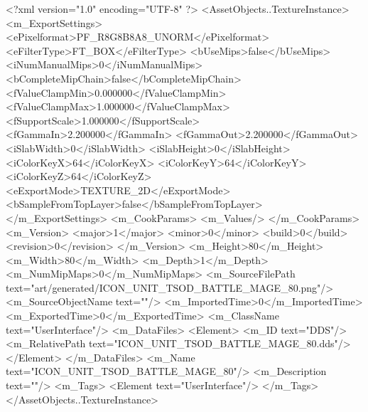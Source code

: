 <?xml version="1.0" encoding="UTF-8" ?>
<AssetObjects..TextureInstance>
	<m_ExportSettings>
		<ePixelformat>PF_R8G8B8A8_UNORM</ePixelformat>
		<eFilterType>FT_BOX</eFilterType>
		<bUseMips>false</bUseMips>
		<iNumManualMips>0</iNumManualMips>
		<bCompleteMipChain>false</bCompleteMipChain>
		<fValueClampMin>0.000000</fValueClampMin>
		<fValueClampMax>1.000000</fValueClampMax>
		<fSupportScale>1.000000</fSupportScale>
		<fGammaIn>2.200000</fGammaIn>
		<fGammaOut>2.200000</fGammaOut>
		<iSlabWidth>0</iSlabWidth>
		<iSlabHeight>0</iSlabHeight>
		<iColorKeyX>64</iColorKeyX>
		<iColorKeyY>64</iColorKeyY>
		<iColorKeyZ>64</iColorKeyZ>
		<eExportMode>TEXTURE_2D</eExportMode>
		<bSampleFromTopLayer>false</bSampleFromTopLayer>
	</m_ExportSettings>
	<m_CookParams>
		<m_Values/>
	</m_CookParams>
	<m_Version>
		<major>1</major>
		<minor>0</minor>
		<build>0</build>
		<revision>0</revision>
	</m_Version>
	<m_Height>80</m_Height>
	<m_Width>80</m_Width>
	<m_Depth>1</m_Depth>
	<m_NumMipMaps>0</m_NumMipMaps>
	<m_SourceFilePath text="art/generated/ICON_UNIT_TSOD_BATTLE_MAGE_80.png"/>
	<m_SourceObjectName text=""/>
	<m_ImportedTime>0</m_ImportedTime>
	<m_ExportedTime>0</m_ExportedTime>
	<m_ClassName text="UserInterface"/>
	<m_DataFiles>
		<Element>
			<m_ID text="DDS"/>
			<m_RelativePath text="ICON_UNIT_TSOD_BATTLE_MAGE_80.dds"/>
		</Element>
	</m_DataFiles>
	<m_Name text="ICON_UNIT_TSOD_BATTLE_MAGE_80"/>
	<m_Description text=""/>
	<m_Tags>
		<Element text="UserInterface"/>
	</m_Tags>
</AssetObjects..TextureInstance>
